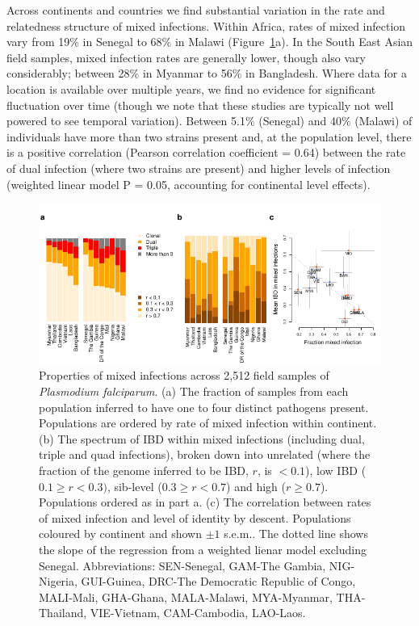 \documentclass[9pt,lineno]{elife}
\begin{document}
Across continents and countries we find substantial variation in the rate and relatedness structure of mixed infections.  Within Africa, rates of mixed infection vary from 19\% in Senegal to 68\% in Malawi (Figure~\ref{fig:mixInfPlot}a).  In the South East Asian field samples, mixed infection rates are generally lower, though also vary considerably; between 28\% in Myanmar to 56\% in Bangladesh.  Where data for a location is available over multiple years, we find no evidence for significant fluctuation over time (though we note that these studies are typically not well powered to see temporal variation).  Between 5.1\% (Senegal) and 40\% (Malawi) of individuals have more than two strains present and, at the population level, there is a positive correlation (Pearson correlation coefficient = 0.64) between the rate of dual infection (where two strains are present) and higher levels of infection (weighted linear model P = 0.05, accounting for continental level effects).

\begin{figure}[h]
  \begin{center}
    \includegraphics[width=\textwidth]{Fig3.pdf}
    \caption{Properties of mixed infections across 2,512 field samples of {\it Plasmodium falciparum}. (a) The fraction of samples from each population inferred to have one to four distinct pathogens present.  Populations are ordered by rate of mixed infection within continent. (b) The spectrum of IBD within mixed infections (including dual, triple and quad infections), broken down into unrelated (where the fraction of the genome inferred to be IBD, $r$, is $< 0.1$), low IBD ($0.1 \geq r < 0.3)$, sib-level ($0.3 \geq r<0.7$) and high ($r \geq 0.7$).  Populations ordered as in part a. (c) The correlation between rates of mixed infection and level of identity by descent. Populations coloured by continent and shown $\pm 1$ s.e.m..  The dotted line shows the slope of the regression from a weighted lienar model excluding Senegal.  Abbreviations: SEN-Senegal, GAM-The Gambia, NIG-Nigeria, GUI-Guinea, DRC-The Democratic Republic of Congo, MALI-Mali, GHA-Ghana, MALA-Malawi, MYA-Myanmar, THA-Thailand, VIE-Vietnam, CAM-Cambodia, LAO-Laos.} \label{fig:mixInfPlot}
  \end{center}
\end{figure}
\end{document}
